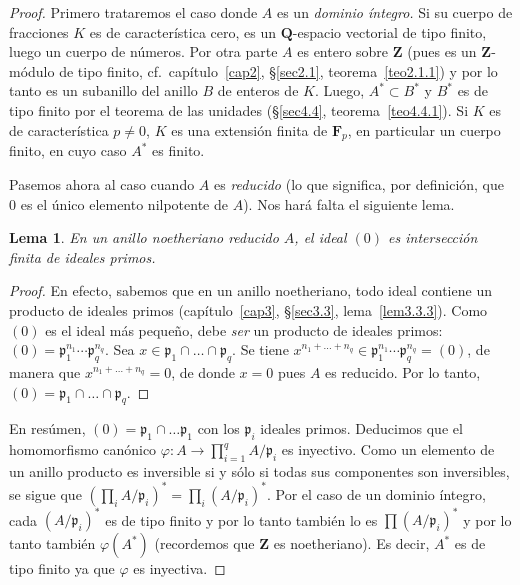 \documentclass[10pt,oneside,bibtotoc,smallheadings,leqno,a5paper,DIV=12]{scrbook}
\newcommand{\QQ}{\mathbf{Q}}
\newcommand{\ZZ}{\mathbf{Z}}
\newcommand{\FF}{\mathbf{F}}
\newcommand{\idl}[1]{\mathfrak{#1}}
\renewcommand{\to}[1][]{\xrightarrow{#1}}
\numberwithin{equation}{section}
\theoremstyle{defi}
\theoremstyle{enonce}
\newtheorem*{lemma*}{Lema}
\theoremstyle{rem}
\numberwithin{theorem}{section}
\numberwithin{proposition}{section}
\numberwithin{definition}{section}
\numberwithin{lemma}{section}
\numberwithin{corollary}{section}
\numberwithin{example}{section}
\numberwithin{footnote}{section}%
\begin{document}
\begin{proof}
Primero trataremos el caso donde $A$ es un {\em dominio \'integro.} Si su cuerpo de fracciones $K$ es
de caracter\'istica cero, es un $\QQ$-espacio vectorial de tipo finito, luego un cuerpo de n\'umeros.
Por otra parte $A$ es entero sobre $\ZZ$ (pues es un $\ZZ$-m\'odulo de tipo finito,
cf.~cap\'itulo~\ref{cap2}, \S\ref{sec2.1}, teorema~\ref{teo2.1.1})
y por lo tanto es un subanillo del anillo $B$ de enteros de $K$. Luego, $A^{*}\subset B^{*}$ y $B^{*}$ es
de tipo finito por el teorema de las unidades (\S\ref{sec4.4}, teorema~\ref{teo4.4.1}). Si $K$ es de caracter\'istica $p\neq 0$, $K$
es una extensi\'on finita de $\FF_{p}$, en particular un cuerpo finito, en cuyo caso $A^{*}$ es finito.

Pasemos ahora al caso cuando $A$ es {\em reducido} (lo que significa, por definici\'on, que $0$ es el
\'unico elemento nilpotente de $A$). Nos har\'a falta el siguiente lema.

\begin{lemma*}
En un anillo noetheriano reducido $A$, el ideal $(0)$ es intersecci\'on finita de ideales primos.
\end{lemma*}

\begin{proof}
En efecto, sabemos que en un anillo noetheriano, todo ideal contiene un producto de ideales primos
(cap\'itulo~\ref{cap3}, \S\ref{sec3.3}, lema~\ref{lem3.3.3}).
Como $(0)$ es el ideal m\'as peque\~no, debe {\em ser} un producto de ideales primos:
$(0) = \idl{p}_{1}^{n_{1}}\cdots\idl{p}_{q}^{n_{q}}$. Sea $x\in\idl{p}_{1}\cap\dots\cap\idl{p}_{q}$. Se
tiene $x^{n_{1}+\dots+n_{q}}\in\idl{p}_{1}^{n_{1}}\cdots\idl{p}_{q}^{n_{q}} = (0)$, de manera que
$x^{n_{1}+\dots+n_{q}}=0$, de donde $x = 0$ pues $A$ es reducido. Por lo tanto, $(0) = \idl{p}_{1}\cap\dots\cap\idl{p}_{q}$.
\end{proof}

En res\'umen, $(0) = \idl{p}_{1}\cap\dots\idl{p}_{1}$ con los $\idl{p}_{i}$ ideales primos. Deducimos que
el homomorfismo can\'onico $\varphi:A\to\prod_{i=1}^{q}A/\idl{p}_{i}$ es inyectivo. Como un elemento de un anillo
producto es inversible si y s\'olo si todas sus componentes son inversibles, se sigue que
$\left(\prod_{i}A/\idl{p}_{i}\right)^{*}=\prod_{i}(A/\idl{p}_{i})^{*}$. Por el caso de un dominio \'integro, cada
$(A/\idl{p}_{i})^{*}$ es de tipo finito y por lo tanto tambi\'en lo es $\prod(A/\idl{p}_{i})^{*}$ y por lo tanto
tambi\'en $\varphi(A^{*})$ (recordemos que $\ZZ$ es noetheriano). Es decir, $A^{*}$ es de tipo finito ya que
$\varphi$ es inyectiva.


\end{proof}
\end{document}
